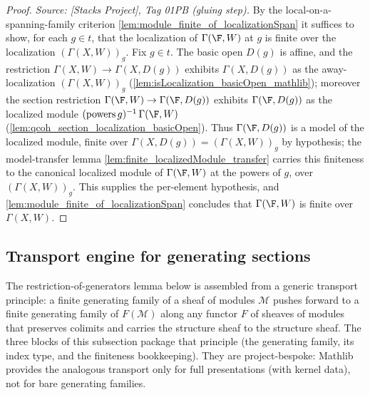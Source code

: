 \begin{proof}
        \leanok
  \textit{Source: [Stacks Project], Tag 01PB (gluing step).}
  By the local-on-a-spanning-family criterion \cref{lem:module_finite_of_localizationSpan}
  it suffices to show, for each \(g \in t\), that the localization of
  \(\Gamma(\F, W)\) at \(g\) is finite over the localization
  \((\Gamma(X, W))_g\). Fix \(g \in t\). The basic open \(D(g)\) is affine, and the
  restriction \(\Gamma(X, W) \to \Gamma(X, D(g))\) exhibits \(\Gamma(X, D(g))\) as
  the away-localization \((\Gamma(X, W))_g\)
  (\cref{lem:isLocalization_basicOpen_mathlib}); moreover the section restriction
  \(\Gamma(\F, W) \to \Gamma(\F, D(g))\) exhibits \(\Gamma(\F, D(g))\) as the
  localized module \((\mathrm{powers}\,g)^{-1}\,\Gamma(\F, W)\)
  (\cref{lem:qcoh_section_localization_basicOpen}). Thus \(\Gamma(\F, D(g))\) is a
  model of the localized module, finite over \(\Gamma(X, D(g)) = (\Gamma(X, W))_g\)
  by hypothesis; the model-transfer lemma
  \cref{lem:finite_localizedModule_transfer} carries this finiteness to the
  canonical localized module of \(\Gamma(\F, W)\) at the powers of \(g\), over
  \((\Gamma(X, W))_g\). This supplies the per-element hypothesis, and
  \cref{lem:module_finite_of_localizationSpan} concludes that \(\Gamma(\F, W)\) is
  finite over \(\Gamma(X, W)\).
\end{proof}

\subsection{Transport engine for generating sections}

The restriction-of-generators lemma below is assembled from a generic transport
principle: a finite generating family of a sheaf of modules \(\mathcal{M}\) pushes
forward to a finite generating family of \(F(\mathcal{M})\) along any functor \(F\) of
sheaves of modules that preserves colimits and carries the structure sheaf to the
structure sheaf. The three blocks of this subsection package that principle (the
generating family, its index type, and the finiteness bookkeeping). They are
project-bespoke: Mathlib provides the analogous transport only for full presentations
(with kernel data), not for bare generating families.

